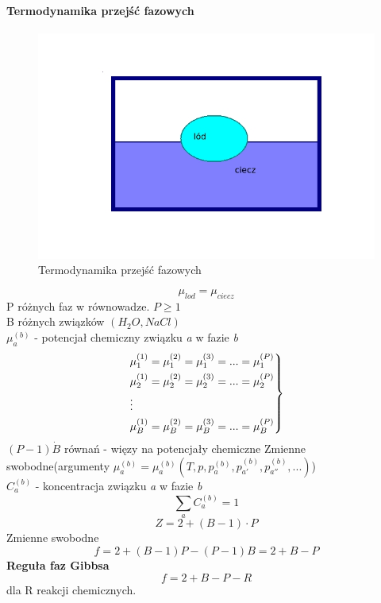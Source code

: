 \documentclass{article}
\begin{document}
		\paragraph{Termodynamika przejść fazowych}
		\begin{figure}[ht]
			\label{fig:fig1}
			\centering
			\includegraphics[scale=0.6]{termodynamikaprzejsc.jpeg}
			\caption{Termodynamika przejść fazowych}
		\end{figure}
		\begin{equation}
		\mu_{lod} = \mu_{ciecz}
		\end{equation}
		P różnych faz w równowadze. $ P \geqslant 1 $\\
		B różnych związków $ (H_2O, NaCl) $\\
		$ \mu_a^{(b)} $ - potencjał chemiczny związku \textit{a} w fazie \textit{b}
		\begin{equation}
			\begin{rcases}
				\mu_1^{(1)}=\mu_1^{(2)}=\mu_1^{(3)} = ... =\mu_1^{(P)} \\
				\mu_2^{(1)}=\mu_2^{(2)}=\mu_2^{(3)} = ... =\mu_2^{(P)} \\
				\vdots \\
				\mu_B^{(1)}=\mu_B^{(2)}=\mu_B^{(3)} = ... =\mu_B^{(P)} \\
			\end{rcases}
		\end{equation}
		$ (P-1) \dot B $ równań - więzy na potencjały chemiczne	
		Zmienne swobodne(argumenty $ \mu_a^{(b)} = \mu_a^{(b)}(T, p, p_a^{(b)}, p_{a'}^{(b)}, p_{a''}^{(b)}, ...)$) \\
		$ C_a^{(b)} $ - koncentracja związku \textit{a} w fazie \textit{b} \\
		\begin{equation}
		\sum_{a}^{}C_a^{(b)} = 1
		\end{equation}
		\begin{equation}
		Z = 2 + (B -1) \cdot P
		\end{equation}
		Zmienne swobodne
		\begin{equation}
		f = 2 + (B-1)P - (P-1)B = 2 + B - P
		\end{equation}		
		\textbf{Reguła faz Gibbsa}
		\begin{equation}
		f = 2 + B - P - R
		\end{equation}
		dla R reakcji chemicznych. \\
\end{document}
